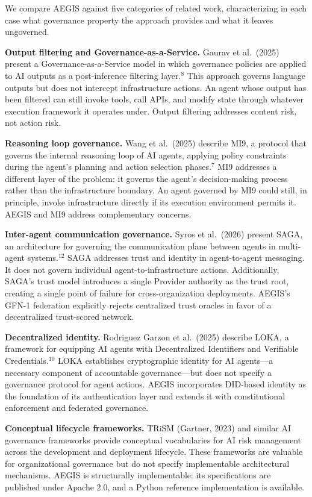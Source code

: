 \documentclass{IEEEcsmag}
\begin{document}
We compare AEGIS against five categories of related work, characterizing in each case what governance property the approach provides and what it leaves ungoverned.

{\bf Output filtering and Governance-as-a-Service.} Gaurav et al.\ (2025) present a Governance-as-a-Service model in which governance policies are applied to AI outputs as a post-inference filtering layer.$^{8}$ This approach governs language outputs but does not intercept infrastructure actions. An agent whose output has been filtered can still invoke tools, call APIs, and modify state through whatever execution framework it operates under. Output filtering addresses content risk, not action risk.

{\bf Reasoning loop governance.} Wang et al.\ (2025) describe MI9, a protocol that governs the internal reasoning loop of AI agents, applying policy constraints during the agent's planning and action selection phases.$^{7}$ MI9 addresses a different layer of the problem: it governs the agent's decision-making process rather than the infrastructure boundary. An agent governed by MI9 could still, in principle, invoke infrastructure directly if its execution environment permits it. AEGIS and MI9 address complementary concerns.

{\bf Inter-agent communication governance.} Syros et al.\ (2026) present SAGA, an architecture for governing the communication plane between agents in multi-agent systems.$^{12}$ SAGA addresses trust and identity in agent-to-agent messaging. It does not govern individual agent-to-infrastructure actions. Additionally, SAGA's trust model introduces a single Provider authority as the trust root, creating a single point of failure for cross-organization deployments. AEGIS's GFN-1 federation explicitly rejects centralized trust oracles in favor of a decentralized trust-scored network.

{\bf Decentralized identity.} Rodriguez Garzon et al.\ (2025) describe LOKA, a framework for equipping AI agents with Decentralized Identifiers and Verifiable Credentials.$^{10}$ LOKA establishes cryptographic identity for AI agents---a necessary component of accountable governance---but does not specify a governance protocol for agent actions. AEGIS incorporates DID-based identity as the foundation of its authentication layer and extends it with constitutional enforcement and federated governance.

{\bf Conceptual lifecycle frameworks.} TRiSM (Gartner, 2023) and similar AI governance frameworks provide conceptual vocabularies for AI risk management across the development and deployment lifecycle. These frameworks are valuable for organizational governance but do not specify implementable architectural mechanisms. AEGIS is structurally implementable: its specifications are published under Apache 2.0, and a Python reference implementation is available.
\end{document}
